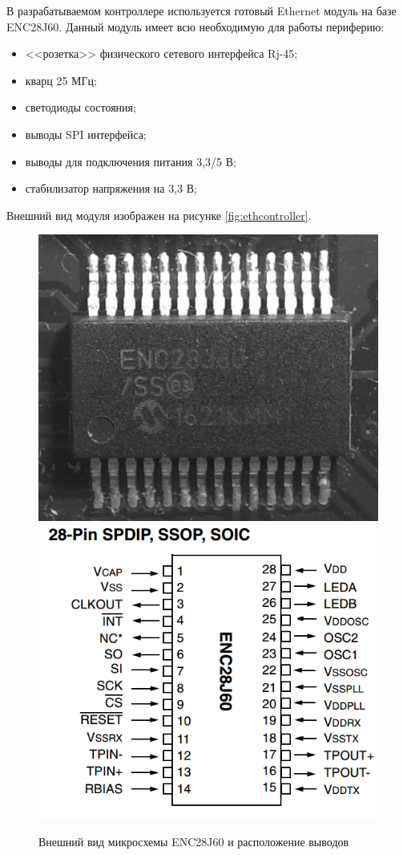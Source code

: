 В разрабатываемом контроллере используется готовый Ethernet модуль на базе ENC28J60. Данный модуль имеет всю необходимую для работы периферию:
\begin{itemize}
	\item <<розетка>> физического сетевого интерфейса Rj-45;
	\item кварц 25 МГц;
	\item светодиоды состояния;
	\item выводы SPI интерфейса;
	\item выводы для подключения питания 3,3/5 В;
	\item стабилизатор напряжения на 3,3 В;
\end{itemize}

Внешний вид модуля изображен на рисунке \ref{fig:ethcontroller}.

\begin{figure}[h!]
	\centering
		\includegraphics[scale=0.09]{img/enc28j60.png}
		\includegraphics[scale=0.36]{img/enc28j60io.png}
	\caption{Внешний вид микросхемы ENC28J60 и расположение выводов\label{fig:enc28j60}}
\end{figure}



